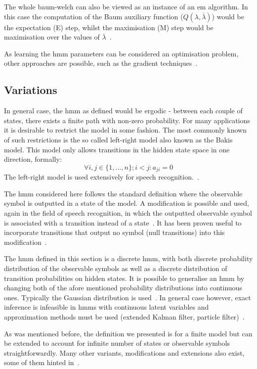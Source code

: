 The whole \gls{baum-welch} can also be viewed as an instance of an \gls{em} algorithm. In this case the computation of the Baum auxiliary function ($Q(\lambda,\overline{\lambda})$) would be the expectation (E) step, whilst the maximisation (M) step would be maximisation over the values of $\overline{\lambda}$~\cite{Dempster1977, Rabiner89hmm}.

As learning the \gls{hmm} parameters can be considered an optimisation problem, other approaches are possible, such as the gradient techniques~\cite{levinson1983, Rabiner89hmm}.

\subsection{Variations}

In general case, the \gls{hmm} as defined would be ergodic - between each couple of states, there exists a finite path with non-zero probability. For many applications it is desirable to restrict the model in some fashion. The most commonly known of such restrictions is the so called left-right model also known as the Bakis model. This model only allows transitions in the hidden state space in one direction, formally: $$\forall i,j \in \{1, ..., n\}; i < j: a_{ji} = 0$$
The left-right model is used extensively for speech recognition.~\cite{bakis1976, jelinek1976}.

The \gls{hmm} considered here follows the standard definition where the observable symbol is outputted in a state of the model. A modification is possible and used, again in the field of speech recognition, in which the outputted observable symbol is associated with a transition instead of a state~\cite{Rabiner89hmm, jelinek1983}. It has been proven useful to incorporate transitions that output no symbol (null transitions) into this modification~\cite{jelinek1983}.

The \gls{hmm} defined in this section is a discrete \acrlong{hmm}, with both discrete probability distribution of the observable symbols as well as a discrete distribution of transition probabilities on hidden states. It is possible to generalise an \gls{hmm} by changing both of the afore mentioned probability distributions into continuous ones. Typically the Gaussian distribution is used~\cite{cappe2005, piyathilaka2013}. In general case however, exact inference is infeasible in \glspl{hmm} with continuous latent variables and approximation methods must be used (extended Kalman filter, particle filter)~\cite{cappe2005}.

As was mentioned before, the definition we presented is for a finite model but can be extended to account for infinite number of states or observable symbols straightforwardly. Many other variants, modifications and extensions also exist, some of them hinted in~\cite{Rabiner89hmm}.
